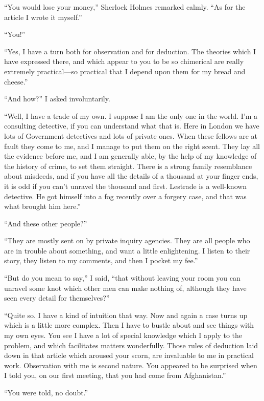 \documentclass[12pt]{book}
\begin{document}
“You would lose your money,” Sherlock Holmes remarked calmly. “As for the article I wrote it myself.” 

“You!” 

“Yes, I have a turn both for observation and for deduction. The theories which I have expressed there, and which appear to you to be so chimerical are really extremely practical—so practical that I depend upon them for my bread and cheese.” 

“And how?” I asked involuntarily. 

“Well, I have a trade of my own. I suppose I am the only one in the world. I’m a consulting detective, if you can understand what that is. Here in London we have lots of Government detectives and lots of private ones. When these fellows are at fault they come to me, and I manage to put them on the right scent. They lay all the evidence before me, and I am generally able, by the help of my knowledge of the history of crime, to set them straight. There is a strong family resemblance about misdeeds, and if you have all the details of a thousand at your finger ends, it is odd if you can’t unravel the thousand and first. Lestrade is a well-known detective. He got himself into a fog recently over a forgery case, and that was what brought him here.” 

“And these other people?” 

“They are mostly sent on by private inquiry agencies. They are all people who are in trouble about something, and want a little enlightening. I listen to their story, they listen to my comments, and then I pocket my fee.” 

“But do you mean to say,” I said, “that without leaving your room you can unravel some knot which other men can make nothing of, although they have seen every detail for themselves?” 

“Quite so. I have a kind of intuition that way. Now and again a case turns up which is a little more complex. Then I have to bustle about and see things with my own eyes. You see I have a lot of special knowledge which I apply to the problem, and which facilitates matters wonderfully. Those rules of deduction laid down in that article which aroused your scorn, are invaluable to me in practical work. Observation with me is second nature. You appeared to be surprised when I told you, on our first meeting, that you had come from Afghanistan.” 

“You were told, no doubt.” 
\end{document}
